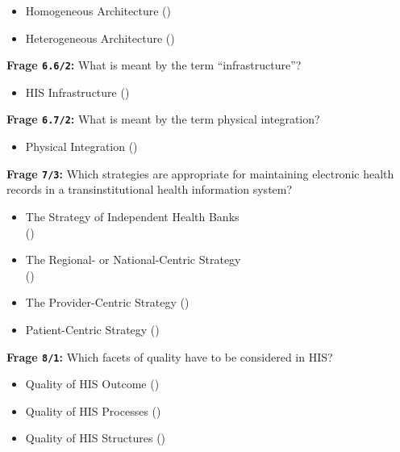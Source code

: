 \begin{itemize}
  \item Homogeneous Architecture ()
  \item Heterogeneous Architecture ()
\end{itemize}

\textbf{Frage \texttt{6.6/2}:} What is meant by the term \enquote{infrastructure}?

\begin{itemize}
  \item HIS Infrastructure ()
\end{itemize}

\textbf{Frage \texttt{6.7/2}:} What is meant by the term physical integration?

\begin{itemize}
  \item Physical Integration ()
\end{itemize}

\textbf{Frage \texttt{7/3}:} Which strategies are appropriate for maintaining electronic health records in a transinstitutional health information system?

\begin{itemize}
  \item The Strategy of Independent Health Banks \\
  ()
  \item The Regional- or National-Centric Strategy \\
  ()
  \item The Provider-Centric Strategy ()
  \item Patient-Centric Strategy ()
\end{itemize}

\textbf{Frage \texttt{8/1}:} Which facets of quality have to be considered in HIS?

\begin{itemize}
  \item Quality of HIS Outcome ()
  \item Quality of HIS Processes ()
  \item Quality of HIS Structures ()
\end{itemize}

